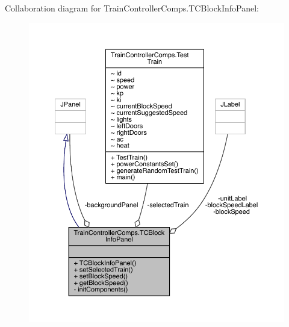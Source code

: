 Collaboration diagram for Train\+Controller\+Comps.\+T\+C\+Block\+Info\+Panel\+:
\nopagebreak
\begin{figure}[H]
\begin{center}
\leavevmode
\includegraphics[width=350pt]{classTrainControllerComps_1_1TCBlockInfoPanel__coll__graph}
\end{center}
\end{figure}
